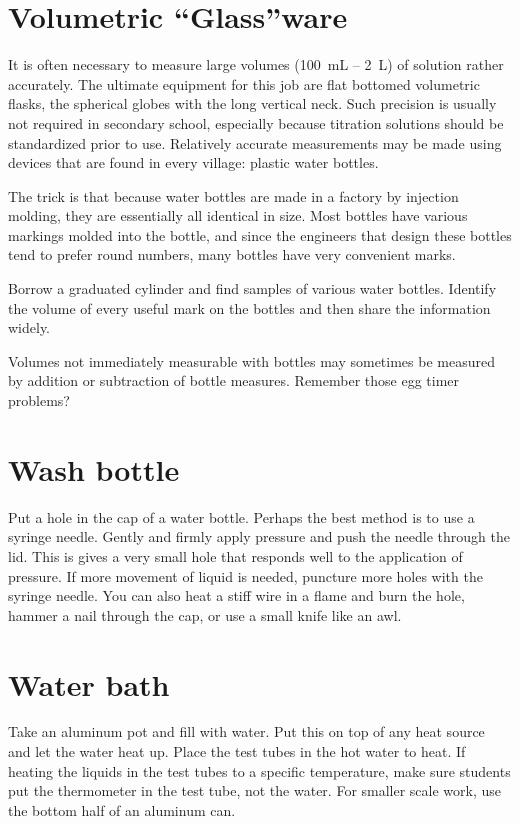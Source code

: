 \section{Volumetric ``Glass''ware}
It is often necessary to measure large volumes (100~mL -- 2~L) 
of solution rather accurately. 
The ultimate equipment for this job are flat bottomed volumetric flasks, 
the spherical globes with the long vertical neck. 
Such precision is usually not required in secondary school, 
especially because titration solutions should be standardized prior to use. 
Relatively accurate measurements may be made using devices 
that are found in every village: plastic water bottles.

The trick is that because water bottles are made in a factory 
by injection molding, 
they are essentially all identical in size. 
Most bottles have various markings molded into the bottle, 
and since the engineers that design these bottles tend 
to prefer round numbers, 
many bottles have very convenient marks.

Borrow a graduated cylinder and find samples of various water bottles. 
Identify the volume of every useful mark on the bottles 
and then share the information widely.

Volumes not immediately measurable with bottles 
may sometimes be measured by addition or subtraction of bottle measures. 
Remember those egg timer problems?

\section{Wash bottle}
Put a hole in the cap of a water bottle. 
Perhaps the best method is to use a syringe needle. 
Gently and firmly apply pressure and push the needle through the lid. 
This is gives a very small hole 
that responds well to the application of pressure. 
If more movement of liquid is needed, 
puncture more holes with the syringe needle. 
You can also heat a stiff wire in a flame and burn the hole, 
hammer a nail through the cap, 
or use a small knife like an awl.

\section{Water bath}
\label{sec:hotwaterbathes}
Take an aluminum pot and fill with water. 
Put this on top of any heat source and let the water heat up. 
Place the test tubes in the hot water to heat. 
If heating the liquids in the test tubes to a specific temperature, 
make sure students put the thermometer in the test tube, 
not the water. 
For smaller scale work, 
use the bottom half of an aluminum can.

